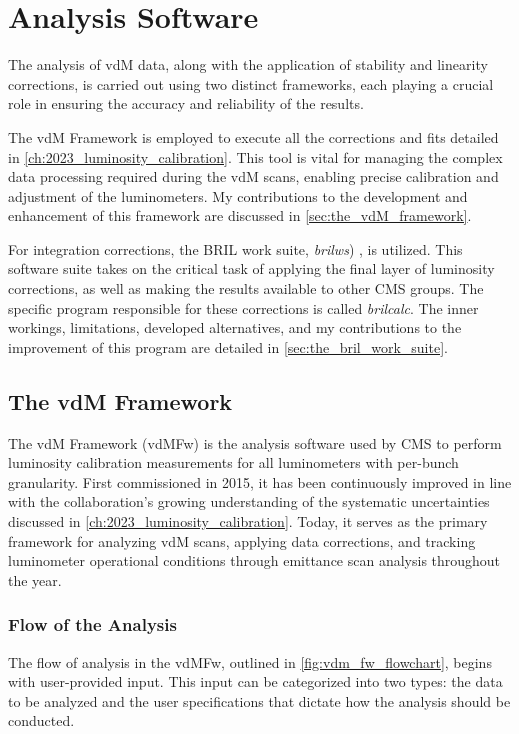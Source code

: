 \chapter{Analysis Software}

The analysis of vdM data, along with the application of stability and linearity corrections, is carried out using two distinct frameworks, each playing a crucial role in ensuring the accuracy and reliability of the results.

The vdM Framework \cite{VdMFramework} is employed to execute all the corrections and fits detailed in \autoref{ch:2023_luminosity_calibration}. This tool is vital for managing the complex data processing required during the vdM scans, enabling precise calibration and adjustment of the luminometers. My contributions to the development and enhancement of this framework are discussed in \autoref{sec:the_vdM_framework}.

For integration corrections, the BRIL work suite, \textit{brilws}) \cite{xie_bril}, is utilized. This software suite takes on the critical task of applying the final layer of luminosity corrections, as well as making the results available to other CMS groups. The specific program responsible for these corrections is called \textit{brilcalc}. The inner workings, limitations, developed alternatives, and my contributions to the improvement of this program are detailed in \autoref{sec:the_bril_work_suite}.

\section{The vdM Framework}
\label{sec:the_vdM_framework}

The vdM Framework (vdMFw) is the analysis software used by CMS to perform luminosity calibration measurements for all luminometers with per-bunch granularity. First commissioned in 2015, it has been continuously improved in line with the collaboration’s growing understanding of the systematic uncertainties discussed in \autoref{ch:2023_luminosity_calibration}. Today, it serves as the primary framework for analyzing vdM scans, applying data corrections, and tracking luminometer operational conditions through emittance scan analysis throughout the year.

\subsection{Flow of the Analysis}

The flow of analysis in the vdMFw, outlined in \autoref{fig:vdm_fw_flowchart}, begins with user-provided input. This input can be categorized into two types: the data to be analyzed and the user specifications that dictate how the analysis should be conducted.

